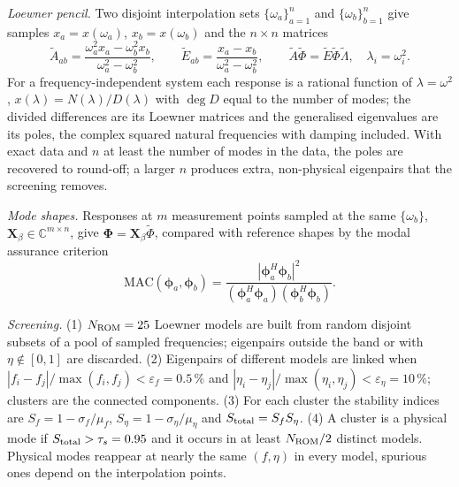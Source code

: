 \emph{Loewner pencil.} Two disjoint interpolation sets $\{\omega_a\}_{a=1}^n$ and $\{\omega_b\}_{b=1}^n$ give samples $x_a=x(\omega_a)$, $x_b=x(\omega_b)$ and the $n\times n$ matrices
\begin{equation}\label{eq:fsi-loewner}
\tilde A_{ab}=\frac{\omega_a^{2}x_a-\omega_b^{2}x_b}{\omega_a^{2}-\omega_b^{2}},\qquad
\tilde E_{ab}=\frac{x_a-x_b}{\omega_a^{2}-\omega_b^{2}},\qquad
\tilde A\tilde\Phi=\tilde E\tilde\Phi\tilde\Lambda,\quad\lambda_i=\omega_i^2 .
\end{equation}
For a frequency-independent system each response is a rational function of $\lambda=\omega^2$, $x(\lambda)=N(\lambda)/D(\lambda)$ with $\deg D$ equal to the number of modes; the divided differences are its Loewner matrices and the generalised eigenvalues are its poles, the complex squared natural frequencies with damping included. With exact data and $n$ at least the number of modes in the data, the poles are recovered to round-off; a larger $n$ produces extra, non-physical eigenpairs that the screening removes.

\emph{Mode shapes.} Responses at $m$ measurement points sampled at the same $\{\omega_b\}$, $\mathbf X_\beta\in\mathbb C^{m\times n}$, give $\boldsymbol\Phi=\mathbf X_\beta\tilde\Phi$, compared with reference shapes by the modal assurance criterion
\begin{equation}\label{eq:fsi-mac}
\mathrm{MAC}(\boldsymbol\phi_a,\boldsymbol\phi_b)=\frac{|\boldsymbol\phi_a^{H}\boldsymbol\phi_b|^{2}}{(\boldsymbol\phi_a^{H}\boldsymbol\phi_a)(\boldsymbol\phi_b^{H}\boldsymbol\phi_b)} .
\end{equation}

\emph{Screening.} (1) $N_{\rm ROM}=25$ Loewner models are built from random disjoint subsets of a pool of sampled frequencies; eigenpairs outside the band or with $\eta\notin[0,1]$ are discarded. (2) Eigenpairs of different models are linked when $|f_i-f_j|/\max(f_i,f_j)<\varepsilon_f=0.5\,\%$ and $|\eta_i-\eta_j|/\max(\eta_i,\eta_j)<\varepsilon_\eta=10\,\%$; clusters are the connected components. (3) For each cluster the stability indices are $S_f=1-\sigma_f/\mu_f$, $S_\eta=1-\sigma_\eta/\mu_\eta$ and $S_{\rm total}=S_fS_\eta$. (4) A cluster is a physical mode if $S_{\rm total}>\tau_s=0.95$ and it occurs in at least $N_{\rm ROM}/2$ distinct models. Physical modes reappear at nearly the same $(f,\eta)$ in every model, spurious ones depend on the interpolation points.

